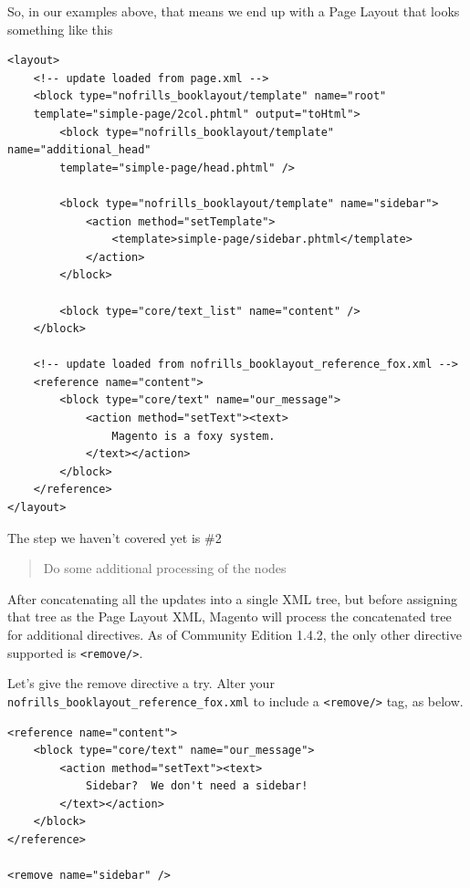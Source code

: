 \documentclass[oneside]{book}
\begin{document}
So, in our examples above, that means we end up with a Page Layout that looks something like this

\begin{lstlisting}
<layout>
    <!-- update loaded from page.xml -->
    <block type="nofrills_booklayout/template" name="root"
    template="simple-page/2col.phtml" output="toHtml">
        <block type="nofrills_booklayout/template" name="additional_head"
        template="simple-page/head.phtml" />

        <block type="nofrills_booklayout/template" name="sidebar">
            <action method="setTemplate">
                <template>simple-page/sidebar.phtml</template>
            </action>
        </block>

        <block type="core/text_list" name="content" />
    </block>

    <!-- update loaded from nofrills_booklayout_reference_fox.xml -->
    <reference name="content">
        <block type="core/text" name="our_message">
            <action method="setText"><text>
                Magento is a foxy system.
            </text></action>
        </block>
    </reference>
</layout>

\end{lstlisting}


The step we haven't covered yet is \#2

\begin{quote}
Do some additional processing of the nodes
\end{quote}

After concatenating all the updates into a single XML tree, but before assigning that tree as the Page Layout XML, Magento will process the concatenated tree for additional directives.  As of Community Edition 1.4.2, the only other directive supported is \footnotesize\texttt{\textless remove/\textgreater }\normalsize.

Let's give the remove directive a try.  Alter your \footnotesize\texttt{nofrills\_booklayout\_reference\_fox.xml} \normalsize  to include a \footnotesize\texttt{\textless remove/\textgreater } \normalsize  tag, as below.

\begin{lstlisting}
<reference name="content">
    <block type="core/text" name="our_message">
        <action method="setText"><text>
            Sidebar?  We don't need a sidebar!
        </text></action>
    </block>
</reference>

<remove name="sidebar" />

\end{lstlisting}
\end{document}
